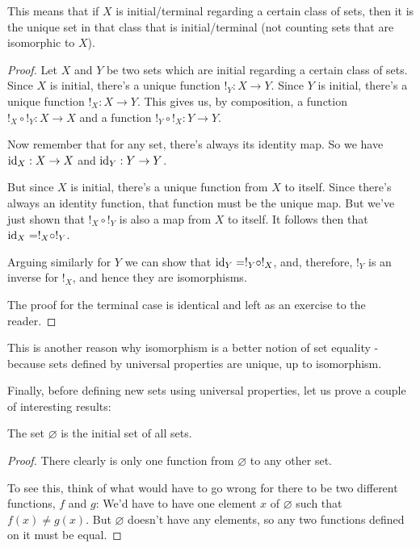 This means that if $X$ is initial/terminal regarding a certain class of sets, then it is the unique set in that class that is initial/terminal (not counting sets that are isomorphic to $X$).

\begin{proof}
	Let $X$ and $Y$ be two sets which are initial regarding a certain class of sets. Since $X$ is initial, there's a unique function $!_Y:X\to Y$. Since $Y$ is initial, there's a unique function $!_X:X\to Y$. This gives us, by composition, a function $!_X\circ!_Y:X\to X$ and a function $!_Y\circ!_X:Y\to Y$.
	
	Now remember that for any set, there's always its identity map. So we have ${\rm id}_X:X\to X$ and ${\rm id}_Y:Y\to Y$.
	
	But since $X$ is initial, there's a unique function from $X$ to itself. Since there's always an identity function, that function must be the unique map. But we've just shown that $!_X\circ!_Y$ is also a map from $X$ to itself. It follows then that ${\rm id}_X=!_X\circ!_Y$.
	
	Arguing similarly for $Y$ we can show that ${\rm id}_Y=!_Y\circ!_X$, and, therefore, $!_Y$ is an inverse for $!_X$, and hence they are isomorphisms.
	
	\bigskip
	The proof for the terminal case is identical and left as an exercise to the reader.
\end{proof}

This is another reason why isomorphism is a better notion of set equality - because sets defined by universal properties are unique, up to isomorphism.

Finally, before defining new sets using universal properties, let us prove a couple of interesting results:

\begin{lemma}
	The set $\varnothing$ is the initial set of all sets.
\end{lemma}
\begin{proof}
	There clearly is only one function from $\varnothing$ to any other set.
	
	To see this, think of what would have to go wrong for there to be two different functions, $f$ and $g$: We'd have to have one element $x$ of $\varnothing$ such that $f(x)\neq g(x)$. But $\varnothing$ doesn't have any elements, so any two functions defined on it must be equal.
\end{proof}

